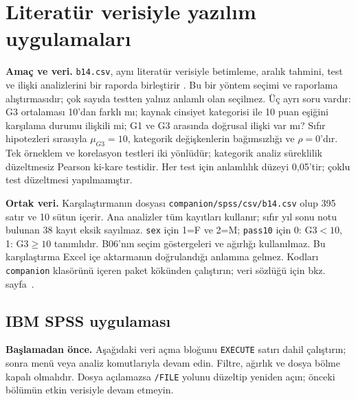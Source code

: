\section{Literatür verisiyle yazılım uygulamaları}
\label{sec:spss-b14}

\textbf{Amaç ve veri.} \texttt{b14.csv}, aynı literatür verisiyle
betimleme, aralık tahmini, test ve ilişki analizlerini bir raporda
birleştirir \citep{cortez2008data}. Bu bir yöntem seçimi ve raporlama
alıştırmasıdır; çok sayıda testten yalnız anlamlı olan seçilmez.
Üç ayrı soru vardır: G3 ortalaması 10'dan farklı mı; kaynak cinsiyet
kategorisi ile 10 puan eşiğini karşılama durumu ilişkili mi;
G1 ve G3 arasında doğrusal ilişki var mı? Sıfır hipotezleri sırasıyla
$\mu_{G3}=10$, kategorik değişkenlerin bağımsızlığı ve $\rho=0$'dır.
Tek örneklem ve korelasyon testleri iki yönlüdür; kategorik analiz
süreklilik düzeltmesiz Pearson ki-kare testidir. Her test için
anlamlılık düzeyi 0,05'tir; çoklu test düzeltmesi yapılmamıştır.

\textbf{Ortak veri.} Karşılaştırmanın dosyası
\nolinkurl{companion/spss/csv/b14.csv} olup 395 satır ve 10 sütun
içerir. Ana analizler tüm kayıtları kullanır; sıfır yıl sonu notu
bulunan 38 kayıt eksik sayılmaz. \texttt{sex} için 1=F ve 2=M;
\texttt{pass10} için 0: G3$<10$, 1: G3$\geq10$ tanımlıdır.
B06'nın seçim göstergeleri ve ağırlığı kullanılmaz. Bu karşılaştırma
Excel içe aktarmanın doğrulandığı anlamına gelmez. Kodları
\texttt{companion} klasörünü içeren paket kökünden çalıştırın;
veri sözlüğü için bkz. sayfa~\pageref{sec:spss-guide}.

\subsection{IBM SPSS uygulaması}
\textbf{Başlamadan önce.} Aşağıdaki veri açma bloğunu
\texttt{EXECUTE} satırı dahil çalıştırın; sonra menü veya analiz
komutlarıyla devam edin. Filtre, ağırlık ve dosya bölme kapalı
olmalıdır. Dosya açılamazsa \texttt{/FILE} yolunu düzeltip yeniden
açın; önceki bölümün etkin verisiyle devam etmeyin.

